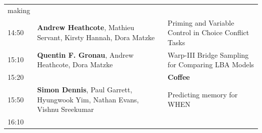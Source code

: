 \documentclass[]{article}
\begin{document}
\begin{longtable}[]{@{}lll@{}}
\begin{minipage}[t]{0.57\columnwidth}
making\strut
\end{minipage}\tabularnewline
\begin{minipage}[t]{0.03\columnwidth}\raggedright\strut
14:50\strut
\end{minipage} & \begin{minipage}[t]{0.32\columnwidth}\raggedright\strut
\textbf{Andrew Heathcote}, Mathieu Servant, Kirsty Hannah, Dora
Matzke\strut
\end{minipage} & \begin{minipage}[t]{0.57\columnwidth}\raggedright\strut
Priming and Variable Control in Choice Conflict Tasks\strut
\end{minipage}\tabularnewline
\begin{minipage}[t]{0.03\columnwidth}\raggedright\strut
15:10\strut
\end{minipage} & \begin{minipage}[t]{0.32\columnwidth}\raggedright\strut
\textbf{Quentin F. Gronau}, Andrew Heathcote, Dora Matzke\strut
\end{minipage} & \begin{minipage}[t]{0.57\columnwidth}\raggedright\strut
Warp-III Bridge Sampling for Comparing LBA Models\strut
\end{minipage}\tabularnewline
\begin{minipage}[t]{0.03\columnwidth}\raggedright\strut
15:20\strut
\end{minipage} & \begin{minipage}[t]{0.32\columnwidth}\raggedright\strut
\strut
\end{minipage} & \begin{minipage}[t]{0.57\columnwidth}\raggedright\strut
\textbf{Coffee}\strut
\end{minipage}\tabularnewline
\begin{minipage}[t]{0.03\columnwidth}\raggedright\strut
15:50\strut
\end{minipage} & \begin{minipage}[t]{0.32\columnwidth}\raggedright\strut
\textbf{Simon Dennis}, Paul Garrett, Hyungwook Yim, Nathan Evans, Vishnu
Sreekumar\strut
\end{minipage} & \begin{minipage}[t]{0.57\columnwidth}\raggedright\strut
Predicting memory for WHEN\strut
\end{minipage}\tabularnewline
\begin{minipage}[t]{0.03\columnwidth}\raggedright\strut
16:10\strut
\end{minipage} & \begin{minipage}[t]{0.32\columnwidth}\raggedright\strut

\end{minipage}
\end{longtable}
\end{document}
